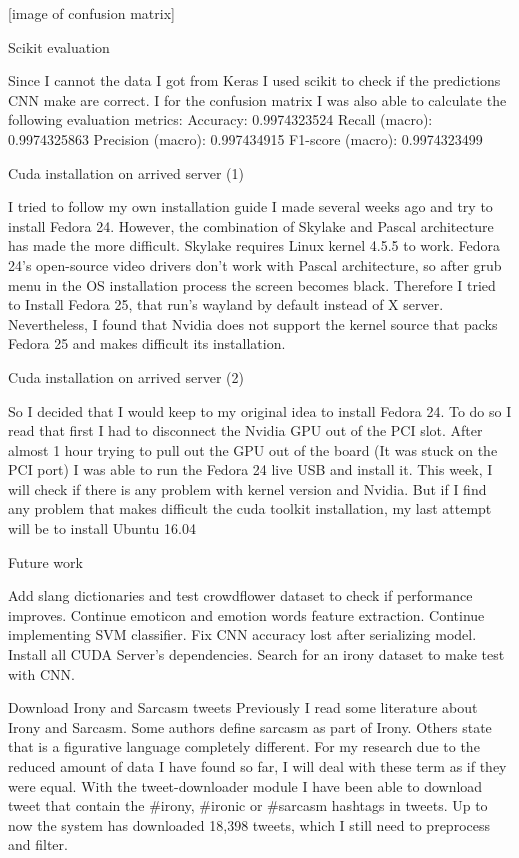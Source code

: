 [image of confusion matrix]

Scikit evaluation\cite{scikit-learn}

Since I cannot the data I got from Keras I used scikit to check if the predictions CNN make are correct. I for the confusion matrix I was also able to calculate the following evaluation metrics:
Accuracy: 0.9974323524
Recall (macro): 0.9974325863
Precision (macro): 0.997434915
F1-score (macro): 0.9974323499

Cuda installation on arrived server (1)

I tried to follow my own installation guide I made several weeks ago and try to install Fedora 24. However, the combination of Skylake and Pascal architecture has made the more difficult.
Skylake requires Linux kernel 4.5.5 to work.
Fedora 24’s open-source video drivers don’t work with Pascal architecture, so after grub menu in the OS installation process the screen becomes black.
Therefore I tried to Install Fedora 25, that run’s wayland by default instead of X server. Nevertheless, I found that Nvidia does not support the kernel source that packs Fedora 25 and makes difficult its installation.

Cuda installation on arrived server (2)

So I decided that I would keep to my original idea to install Fedora 24. To do so I read that first I had to disconnect the Nvidia GPU out of the PCI slot. After almost 1 hour trying to pull out the GPU out of the board (It was stuck on the PCI port) I was able to run the Fedora 24 live USB and install it.
This week, I will check if there is any problem with kernel version and Nvidia. But if I find any problem that makes difficult the cuda toolkit installation, my last attempt will be to install Ubuntu 16.04

Future work

Add slang dictionaries and test crowdflower dataset to check if performance improves.
Continue emoticon and emotion words feature extraction.
Continue implementing SVM classifier.
Fix CNN accuracy lost after serializing model.
Install all CUDA Server’s dependencies.
Search for an irony dataset to make test with CNN.

Download Irony and Sarcasm tweets
Previously I read some literature about Irony and Sarcasm. Some authors define sarcasm as part of Irony. Others state that is a figurative language completely different. For my research due to the reduced amount of data I have found so far, I will deal with these term as if they were equal.
With the tweet-downloader module I have been able to download tweet that contain the \#irony, \#ironic or \#sarcasm hashtags in tweets. Up to now the system has downloaded 18,398 tweets, which I still need to preprocess and filter.

